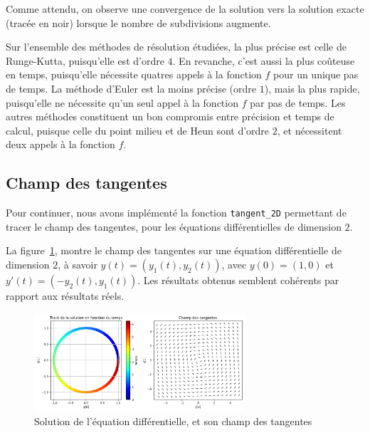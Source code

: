 Comme attendu, on observe une convergence de la solution vers la solution exacte (tracée en noir)
lorsque le nombre de subdivisions augmente.

Sur l'ensemble des méthodes de résolution étudiées, la plus précise est celle de Runge-Kutta, puisqu'elle est d'ordre $4$.
En revanche, c'est aussi la plus coûteuse en temps, puisqu'elle nécessite quatres appels à la fonction $f$ pour un unique pas de temps.
La méthode d'Euler est la moins précise (ordre $1$), mais la plus rapide, puisqu'elle ne nécessite qu'un seul appel à la fonction $f$ par pas de temps.
Les autres méthodes constituent un bon compromis entre précision et temps de calcul, puisque celle du point milieu et de Heun sont d'ordre $2$, et nécessitent deux appels à la fonction $f$.

\subsection{Champ des tangentes}
Pour continuer, nous avons implémenté la fonction \texttt{tangent\_2D} permettant de tracer le champ des tangentes,
pour les équations différentielles de dimension $2$.

La figure~\ref{fig:tangente}, montre le champ des tangentes sur une équation différentielle
de dimension $2$, à savoir $y(t)=(y_1(t),y_2(t))$, avec $y(0)=(1,0)$ et $y'(t)=(-y_2(t),y_1(t))$.
Les résultats obtenus semblent cohérents par rapport aux résultats réels.

\begin{figure}[htbp!]
	\centering
	\includegraphics[width=0.7\textwidth]{res/tangente}
	\caption{Solution de l'équation différentielle, et son champ des tangentes}
	\label{fig:tangente}
\end{figure}

\vspace*{-0.7cm}
